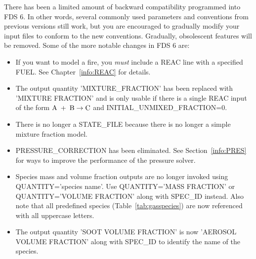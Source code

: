 \documentclass[11pt]{book}
\begin{document}
There has been a limited amount of backward compatibility programmed into FDS 6. In other words, several commonly used parameters and conventions from previous versions still
work, but you are encouraged to gradually modify your input files to conform to the new conventions. Gradually, obsolescent features will be removed. Some of the more notable changes
in FDS 6 are:
\begin{itemize}
\item If you want to model a fire, you {\em must} include a {\ct REAC} line with a specified {\ct FUEL}. See Chapter~\ref{info:REAC} for details.
\item The output quantity {\ct 'MIXTURE\_FRACTION'} has been replaced with {\ct 'MIXTURE FRACTION'} and is only usable if there is a single {\ct REAC} input of the form ${\rm A} \; + \; {\rm B} \rightarrow {\rm C}$ and {\ct INITIAL\_UNMIXED\_FRACTION=0}.
\item There is no longer a {\ct STATE\_FILE} because there is no longer a simple mixture fraction model.
\item {\ct PRESSURE\_CORRECTION} has been eliminated. See Section~\ref{info:PRES} for ways to improve the performance of the pressure solver.
\item Species mass and volume fraction outputs are no longer invoked using {\ct QUANTITY='species name'}. Use {\ct QUANTITY='MASS FRACTION'} or {\ct QUANTITY='VOLUME FRACTION'} along with
{\ct SPEC\_ID} instead.  Also note that all predefined species (Table~\ref{tab:gasspecies}) are now referenced with all uppercase letters.
\item The output quantity {\ct 'SOOT VOLUME FRACTION'} is now {\ct 'AEROSOL VOLUME FRACTION'} along with {\ct SPEC\_ID} to identify the name of the species.
\end{itemize}
\end{document}
